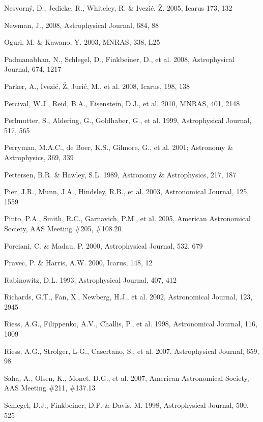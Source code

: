 \documentclass{emulateapj}
\begin{document}
\begin{thebibliography}{}
\bibitem[()]{} Nesvorn\'{y}, D., Jedicke, R., Whiteley, R. \& Ivezi\'{c}, \v{Z}. 2005, Icarus 173, 132

\bibitem[()]{} Newman, J., 2008, Astrophysical Journal, 684, 88

\bibitem[()]{} Oguri, M. \& Kawano, Y. 2003, MNRAS, 338, L25 

\bibitem[()]{} Padmanabhan, N., Schlegel, D., Finkbeiner, D., et al. 2008, Astrophysical Journal, 674, 1217

\bibitem[()]{} Parker, A., Ivezi\'{c}, \v{Z}, Juri\'{c}, M., et al. 2008, Icarus, 198, 138

\bibitem[()]{} Percival, W.J., Reid, B.A., Eisenstein, D.J., et al. 2010, MNRAS, 401, 2148 

\bibitem[()]{} Perlmutter, S., Aldering, G., Goldhaber, G., et al. 1999, Astrophysical Journal, 517, 565

\bibitem[()]{} Perryman, M.A.C., de Boer, K.S., Gilmore, G., et al. 2001; Astronomy \& 
             Astrophysics, 369, 339

\bibitem[()]{} Pettersen, B.R. \& Hawley, S.L. 1989, Astronomy \& Astrophysics, 217, 187

\bibitem[()]{} Pier, J.R., Munn, J.A., Hindsley, R.B., et al. 2003, Astronomical Journal, 125, 1559

\bibitem[()]{} Pinto, P.A., Smith, R.C., Garnavich, P.M., et al. 2005, 
              American Astronomical Society, AAS Meeting \#205, \#108.20

\bibitem[()]{} Porciani, C. \& Madau, P. 2000, Astrophysical Journal, 532, 679

\bibitem[()]{} Pravec, P. \& Harris, A.W. 2000, Icarus, 148, 12

\bibitem[()]{} Rabinowitz, D.L. 1993,  Astrophysical Journal, 407, 412

\bibitem[()]{} Richards, G.T., Fan, X., Newberg, H.J., et al. 2002, Astronomical Journal, 123, 2945

\bibitem[()]{} Riess, A.G., Filippenko, A.V., Challis, P., et al. 1998, Astronomical Journal, 116, 1009

\bibitem[()]{} Riess, A.G., Strolger, L-G., Casertano, S., et al. 2007, Astrophysical Journal, 659, 98

\bibitem[()]{} Saha, A., Olsen, K., Monet, D.G., et al. 2007, American Astronomical Society, AAS 
             Meeting \#211, \#137.13

\bibitem[()]{} Schlegel, D.J., Finkbeiner, D.P. \& Davis, M. 1998, Astrophysical Journal, 500, 525


\end{thebibliography}
\end{document}
